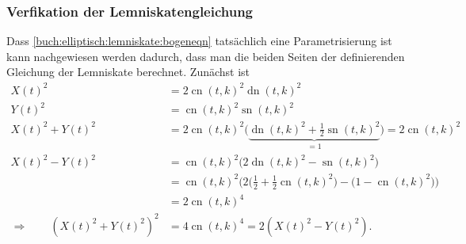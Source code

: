 \subsubsection{Verfikation der Lemniskatengleichung}
Dass \eqref{buch:elliptisch:lemniskate:bogeneqn}
tatsächlich eine Parametrisierung ist kann nachgewiesen werden dadurch,
dass man die beiden Seiten der definierenden Gleichung der
Lemniskate berechnet.
Zunächst ist
\begin{align*}
X(t)^2
&=
2\operatorname{cn}(t,k)^2
\operatorname{dn}(t,k)^2
\\
Y(t)^2
&=
\operatorname{cn}(t,k)^2
\operatorname{sn}(t,k)^2
\\
X(t)^2+Y(t)^2
&=
2\operatorname{cn}(t,k)^2
\bigl(
\underbrace{
\operatorname{dn}(t,k)^2
+{\textstyle\frac12}
\operatorname{sn}(t,k)^2
}_{\displaystyle =1}
\bigr)
=
2\operatorname{cn}(t,k)^2
\\
X(t)^2-Y(t)^2
&=
\operatorname{cn}(t,k)^2
\bigl(
2\operatorname{dn}(t,k)^2 - \operatorname{sn}(t,k)^2
\bigr)
\\
&=
\operatorname{cn}(t,k)^2
\bigl(
2\bigl({\textstyle\frac12}+{\textstyle\frac12}\operatorname{cn}(t,k)^2\bigr)
-
\bigl(1-\operatorname{cn}(t,k)^2\bigr)
\bigr)
\\
&=
2\operatorname{cn}(t,k)^4
\\
\Rightarrow\qquad
(X(t)^2+Y(t)^2)^2
&=
4\operatorname{cn}(t,k)^4
=
2(X(t)^2-Y(t)^2).
\end{align*}

%
%
